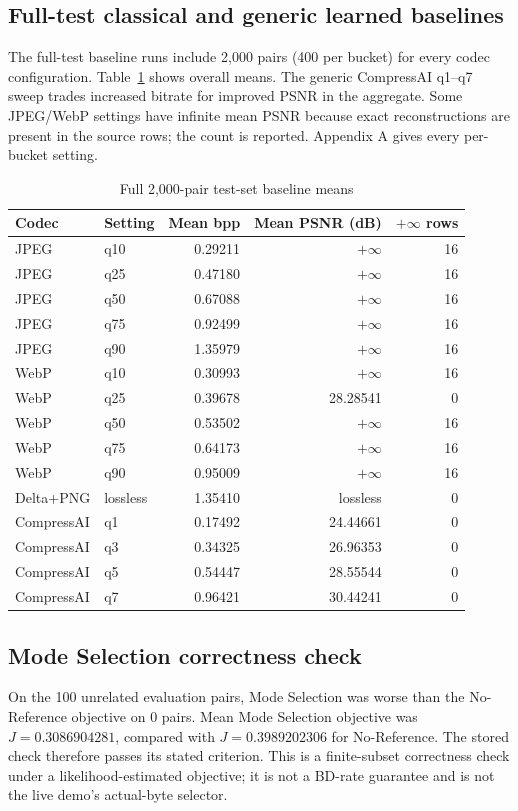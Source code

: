 \documentclass[conference]{IEEEtran}
\begin{document}
\subsection{Full-test classical and generic learned baselines}
The full-test baseline runs include 2,000 pairs (400 per bucket) for every codec configuration. Table~\ref{tab:fulloverall} shows overall means. The generic CompressAI q1--q7 sweep trades increased bitrate for improved PSNR in the aggregate. Some JPEG/WebP settings have infinite mean PSNR because exact reconstructions are present in the source rows; the count is reported. Appendix A gives every per-bucket setting.

\begin{table}[t]
\caption{Full 2,000-pair test-set baseline means}
\label{tab:fulloverall}
\centering
\scriptsize
\begin{tabular}{llrrr}
\toprule
Codec & Setting & Mean bpp & Mean PSNR (dB) & $+\infty$ rows\\
\midrule
JPEG & q10 & 0.29211 & $+\infty$ & 16\\
JPEG & q25 & 0.47180 & $+\infty$ & 16\\
JPEG & q50 & 0.67088 & $+\infty$ & 16\\
JPEG & q75 & 0.92499 & $+\infty$ & 16\\
JPEG & q90 & 1.35979 & $+\infty$ & 16\\
WebP & q10 & 0.30993 & $+\infty$ & 16\\
WebP & q25 & 0.39678 & 28.28541 & 0\\
WebP & q50 & 0.53502 & $+\infty$ & 16\\
WebP & q75 & 0.64173 & $+\infty$ & 16\\
WebP & q90 & 0.95009 & $+\infty$ & 16\\
Delta+PNG & lossless & 1.35410 & lossless & 0\\
CompressAI & q1 & 0.17492 & 24.44661 & 0\\
CompressAI & q3 & 0.34325 & 26.96353 & 0\\
CompressAI & q5 & 0.54447 & 28.55544 & 0\\
CompressAI & q7 & 0.96421 & 30.44241 & 0\\
\bottomrule
\end{tabular}
\end{table}

\subsection{Mode Selection correctness check}
On the 100 unrelated evaluation pairs, Mode Selection was worse than the No-Reference objective on 0 pairs. Mean Mode Selection objective was $J=0.3086904281$, compared with $J=0.3989202306$ for No-Reference. The stored check therefore passes its stated criterion. This is a finite-subset correctness check under a likelihood-estimated objective; it is not a BD-rate guarantee and is not the live demo's actual-byte selector.
\end{document}
